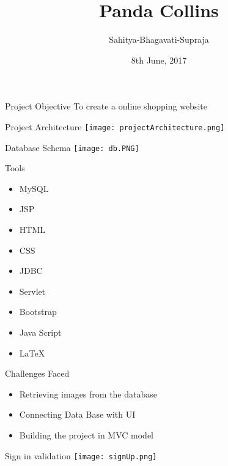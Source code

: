\documentclass[14pt]{beamer}
\title{Panda Collins}
\author{Sahitya-Bhagavati-Supraja}
\institute{BVRITH}
\date{8th June, 2017}
\begin{document}
\begin{frame}
   \titlepage
\end{frame}

\begin{frame}{Project Objective}
To create a online shopping website
\end{frame}

\begin{frame}{Project Architecture}
    \texttt{[image: projectArchitecture.png]}
\end{frame}


\begin{frame}{Database Schema}
    \texttt{[image: db.PNG]}
\end{frame}

\begin{frame}{Tools}
   \begin{itemize}
    \item{MySQL}
    \item{JSP}
    \item{HTML}
    \item{CSS}
    \item{JDBC}
    \item{Servlet}
    \item{Bootstrap}
    \item{Java Script} 
    \item{LaTeX}
   \end{itemize}
\end{frame}

\begin{frame}{Challenges Faced}
    \begin{itemize}
        \item{Retrieving images from the database}
        \item{Connecting Data Base with UI}
        \item{Building the project in MVC model}
    \end{itemize}
\end{frame}


\begin{frame}{Sign in validation}
\texttt{[image: signUp.png]}
\end{frame}
\end{document}
